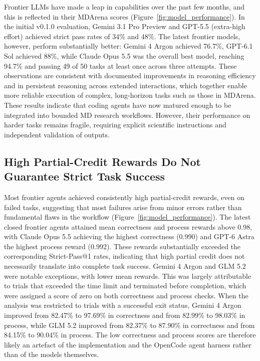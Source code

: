 Frontier LLMs have made a leap in capabilities over the past few months, and this is reflected in their MDArena scores (Figure~\ref{fig:model_performance}). In the initial v0.1.0 evaluation, Gemini 3.1 Pro Preview and GPT-5.5 (extra-high effort) achieved strict pass rates of 34\% and 48\%. The latest frontier models, however, perform substantially better: Gemini 4 Argon achieved 76.7\%, GPT-6.1 Sol achieved 88\%, while Claude Opus 5.5 was the overall best model, reaching 94.7\% and passing 49 of 50 tasks at least once across three attempts. These observations are consistent with documented improvements in reasoning efficiency and in persistent reasoning across extended interactions, which together enable more reliable execution of complex, long-horizon tasks such as those in MDArena. These results indicate that coding agents have now matured enough to be integrated into bounded MD research workflows. However, their performance on harder tasks remains fragile, requiring explicit scientific instructions and independent validation of outputs.


\subsection[Partial credit and strict task success]{High Partial-Credit Rewards Do Not Guarantee Strict Task Success}

Most frontier agents achieved consistently high partial-credit rewards, even on failed tasks, suggesting that most failures arise from minor errors rather than fundamental flaws in the workflow (Figure~\ref{fig:model_performance}). The latest closed frontier agents attained mean correctness and process rewards above 0.98, with Claude Opus 5.5 achieving the highest correctness (0.990) and GPT-6 Astra the highest process reward (0.992). These rewards substantially exceeded the corresponding Strict-Pass@1 rates, indicating that high partial credit does not necessarily translate into complete task success. Gemini 4 Argon and GLM 5.2 were notable exceptions, with lower mean rewards. This was largely attributable to trials that exceeded the time limit and terminated before completion, which were assigned a score of zero on both correctness and process checks. When the analysis was restricted to trials with a successful exit status, Gemini 4 Argon improved from 82.47\% to 97.69\% in correctness and from 82.99\% to 98.03\% in process, while GLM 5.2 improved from 82.37\% to 87.90\% in correctness and from 84.15\% to 90.04\% in process. The low correctness and process scores are therefore likely an artefact of the implementation and the OpenCode agent harness rather than of the models themselves.

